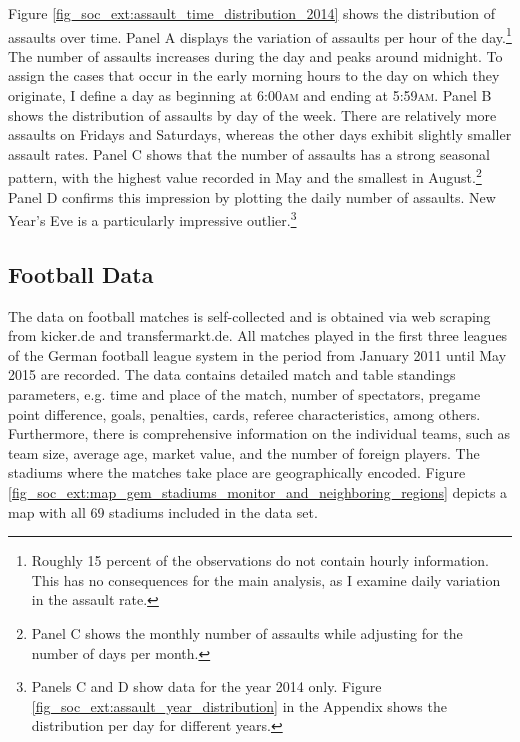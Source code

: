 Figure \ref{fig_soc_ext:assault_time_distribution_2014} shows the distribution of assaults over time. Panel A displays the variation of assaults per hour of the day.\footnote{Roughly 15 percent of the observations do not contain hourly information. This has no consequences for the main analysis, as I examine daily variation in the assault rate.} The number of assaults increases during the day and peaks around midnight. To assign the cases that occur in the early morning hours to the day on which they originate, I define a day as beginning at 6:00\textsc{am} and ending at 5:59\textsc{am}. Panel B shows the distribution of assaults by day of the week. There are relatively more assaults on Fridays and Saturdays, whereas the other days exhibit slightly smaller assault rates. Panel C shows that the number of assaults has a strong seasonal pattern, with the highest value recorded in May and the smallest in August.\footnote{Panel C shows the monthly number of assaults while adjusting for the number of days per month.} Panel D confirms this impression by plotting the daily number of assaults. New Year's Eve is a particularly impressive outlier.\footnote{Panels C and D show data for the year 2014 only. Figure \ref{fig_soc_ext:assault_year_distribution} in the Appendix shows the distribution per day for different years.}






\subsection{Football Data}
The data on football matches is self-collected and is obtained via web scraping from kicker.de and transfermarkt.de. All matches played in the first three leagues of the German football league system in the period from January 2011 until May 2015 are recorded. The data contains detailed match and table standings parameters, e.g. time and place of the match, number of spectators, pregame point difference, goals, penalties, cards, referee characteristics, among others. Furthermore, there is comprehensive information on the individual teams, such as team size, average age, market value, and the number of foreign players. The stadiums where the matches take place are geographically encoded. Figure \ref{fig_soc_ext:map_gem_stadiums_monitor_and_neighboring_regions} depicts a map with all 69 stadiums included in the data set.

